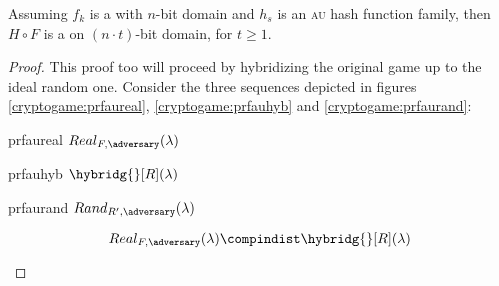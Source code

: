 \begin{theorem}
    Assuming $f_k$ is a \prf{} with $n$-bit domain and $h_s$ is an \textsc{au} hash function family, then $H \circ F$ is a \prf{} on $(n \cdot t)$-bit domain, for $t \geq 1$.
\end{theorem}

\begin{proof}

    This proof too will proceed by hybridizing the original game up to the ideal random one. Consider the three sequences depicted in figures \ref{cryptogame:prfaureal}, \ref{cryptogame:prfauhyb} and \ref{cryptogame:prfaurand}:

    \begin{cryptogame}
        {prfaureal}
        {$Real_{F, \adversary}(\lambda)$}
        {}


        \cseqbeginloop
        \cseqendloop
        
    \end{cryptogame}

    \begin{cryptogame}
        {prfauhyb}
        {$\hybridg{}[R](\lambda)$}
        {}


        \cseqbeginloop
        \cseqendloop
        
    \end{cryptogame}

    \begin{cryptogame}
        {prfaurand}
        {$Rand_{R', \adversary}(\lambda)$}
        {}


        \cseqbeginloop
        \cseqendloop
        
    \end{cryptogame}


    \begin{lemma}
        \[
            Real_{F, \adversary}(\lambda) \compindist \hybridg{}[R](\lambda)
        \]
    \end{lemma}


\end{proof}
